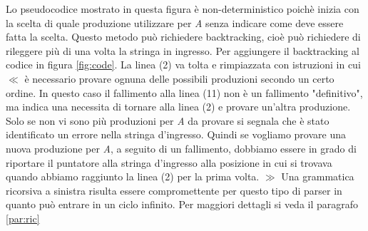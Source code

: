 Lo pseudocodice mostrato \cite{libro: compilatori} in questa figura è non-deterministico poichè inizia con la scelta di quale produzione utilizzare per \textit{A} senza indicare come deve essere fatta la scelta. Questo metodo può richiedere backtracking, cioè può richiedere di rileggere più di una volta la stringa in ingresso. Per aggiungere il backtracking al codice in figura \ref{fig:code}. La linea (2) va tolta e rimpiazzata con istruzioni in cui $\ll$ è necessario provare ognuna delle possibili produzioni secondo un certo ordine. In questo caso il fallimento alla linea (11) non è un fallimento "definitivo", ma indica una necessita di tornare alla linea (2) e provare un'altra produzione. Solo se non vi sono più produzioni per \textit{A} da provare si segnala che è stato identificato un errore nella stringa d'ingresso. Quindi se vogliamo provare una nuova produzione per \textit{A}, a seguito di un fallimento, dobbiamo essere in grado di riportare il puntatore alla stringa d'ingresso alla posizione in cui si trovava quando abbiamo raggiunto la linea (2) per la prima volta. $\gg$ Una grammatica ricorsiva a sinistra risulta essere compromettente per questo tipo di parser in quanto può entrare in un ciclo infinito. Per maggiori dettagli si veda il paragrafo \ref{par:ric}
